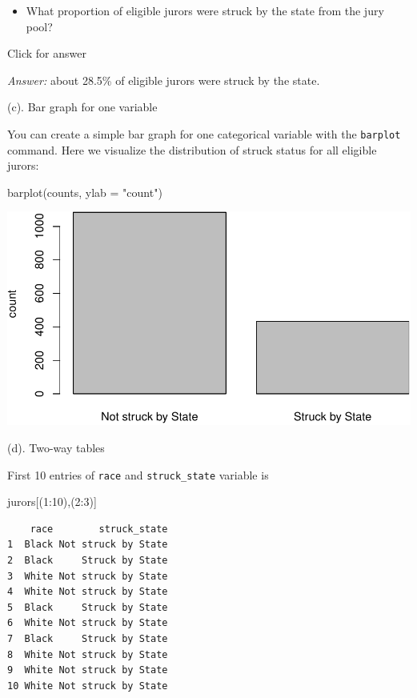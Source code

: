 \documentclass[
]{book}
\newenvironment{Shaded}{\begin{snugshade}}{\end{snugshade}}
\newcommand{\AttributeTok}[1]{\textcolor[rgb]{0.77,0.63,0.00}{#1}}
\newcommand{\DecValTok}[1]{\textcolor[rgb]{0.00,0.00,0.81}{#1}}
\newcommand{\FunctionTok}[1]{\textcolor[rgb]{0.00,0.00,0.00}{#1}}
\newcommand{\NormalTok}[1]{#1}
\newcommand{\SpecialCharTok}[1]{\textcolor[rgb]{0.00,0.00,0.00}{#1}}
\newcommand{\StringTok}[1]{\textcolor[rgb]{0.31,0.60,0.02}{#1}}
\providecommand{\tightlist}{%
  \setlength{\itemsep}{0pt}\setlength{\parskip}{0pt}}
\begin{document}
\begin{itemize}
\tightlist
\item
  What proportion of eligible jurors were struck by the state from the jury pool?
\end{itemize}

Click for answer

\emph{Answer:} about 28.5\% of eligible jurors were struck by the state.

(c). Bar graph for one variable

You can create a simple bar graph for one categorical variable with the \texttt{barplot} command. Here we visualize the distribution of struck status for all eligible jurors:

\begin{Shaded}
\begin{Highlighting}[]
\FunctionTok{barplot}\NormalTok{(counts, }\AttributeTok{ylab =} \StringTok{"count"}\NormalTok{)}
\end{Highlighting}
\end{Shaded}

\includegraphics[width=1\linewidth]{Class_Activity_4_files/figure-latex/unnamed-chunk-8-1}

(d). Two-way tables

First 10 entries of \texttt{race} and \texttt{struck\_state} variable is

\begin{Shaded}
\begin{Highlighting}[]
\NormalTok{jurors[(}\DecValTok{1}\SpecialCharTok{:}\DecValTok{10}\NormalTok{),(}\DecValTok{2}\SpecialCharTok{:}\DecValTok{3}\NormalTok{)]}
\end{Highlighting}
\end{Shaded}

\begin{verbatim}
    race        struck_state
1  Black Not struck by State
2  Black     Struck by State
3  White Not struck by State
4  White Not struck by State
5  Black     Struck by State
6  White Not struck by State
7  Black     Struck by State
8  White Not struck by State
9  White Not struck by State
10 White Not struck by State
\end{verbatim}
\end{document}
